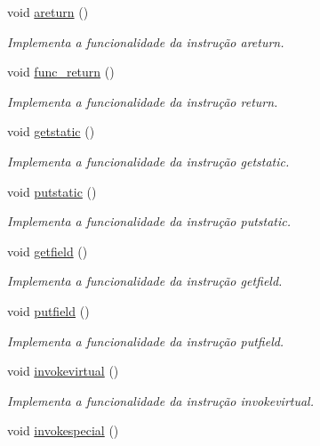 \begin{DoxyCompactItemize}
void \hyperlink{classOperations_a5829421b72f92d50dea0461953b26c5b}{areturn} ()
\begin{DoxyCompactList}\small\item\em Implementa a funcionalidade da instrução areturn. \end{DoxyCompactList}\item 
void \hyperlink{classOperations_aa33b77fb62f7e76c347503c97c6b080b}{func\+\_\+return} ()
\begin{DoxyCompactList}\small\item\em Implementa a funcionalidade da instrução return. \end{DoxyCompactList}\item 
void \hyperlink{classOperations_a0514422a81aa3efa5cb8b3bd1a505a68}{getstatic} ()
\begin{DoxyCompactList}\small\item\em Implementa a funcionalidade da instrução getstatic. \end{DoxyCompactList}\item 
void \hyperlink{classOperations_ac6791ccfd8adf30d8f80b1f679f0b146}{putstatic} ()
\begin{DoxyCompactList}\small\item\em Implementa a funcionalidade da instrução putstatic. \end{DoxyCompactList}\item 
void \hyperlink{classOperations_a0bb399fe0f64dc21699132c092560e19}{getfield} ()
\begin{DoxyCompactList}\small\item\em Implementa a funcionalidade da instrução getfield. \end{DoxyCompactList}\item 
void \hyperlink{classOperations_a56385f246d3d4d5c5674c988a1f0e658}{putfield} ()
\begin{DoxyCompactList}\small\item\em Implementa a funcionalidade da instrução putfield. \end{DoxyCompactList}\item 
void \hyperlink{classOperations_acf53d7e184b8828702b4d5036ef0a7a9}{invokevirtual} ()
\begin{DoxyCompactList}\small\item\em Implementa a funcionalidade da instrução invokevirtual. \end{DoxyCompactList}\item 
void \hyperlink{classOperations_ab561e27c8450ceec7e4f8b0a155fcda3}{invokespecial} ()

\end{DoxyCompactItemize}
